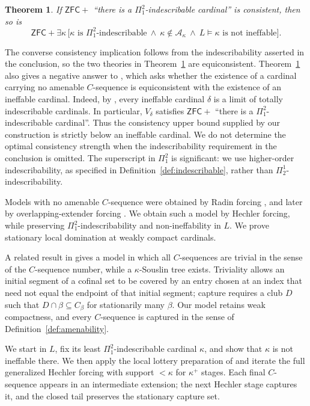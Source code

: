 \documentclass[10pt,a4paper]{amsart}
\newtheorem{theorem}{Theorem}[section]
\theoremstyle{definition}
\theoremstyle{remark}
\newcommand{\A}{\mathcal A}
\newcommand{\ZFC}{\mathsf{ZFC}}
\begin{document}
\begin{theorem}\label{thm:main}
If \(\ZFC+\) ``there is a \(\Pi^2_1\)-indescribable cardinal''
is consistent, then so is
\[
 \ZFC+\exists\kappa\,
 \bigl[\kappa\text{ is }\Pi^2_1\text{-indescribable}
       \ \land\ \kappa\notin\A_\kappa
       \ \land\ L\models\text{\(\kappa\) is not ineffable}\bigr].
\]
\end{theorem}


The converse consistency implication follows from the
indescribability asserted in the conclusion, so the two
theories in Theorem~\ref{thm:main} are equiconsistent.
Theorem~\ref{thm:main} also gives a negative answer to
\cite[Question~5.5]{BNZRad}, which asks whether the existence
of a cardinal carrying no amenable \(C\)-sequence is
equiconsistent with the existence of an ineffable cardinal.
Indeed, by \cite[Lemma~5.4]{HLN}, every ineffable cardinal
\(\delta\) is a limit of totally indescribable cardinals.
In particular, \(V_\delta\) satisfies \(\ZFC+\) ``there is
a \(\Pi^2_1\)-indescribable cardinal''. Thus the consistency
upper bound supplied by our construction is strictly below
an ineffable cardinal. We do not determine the optimal
consistency strength when the indescribability requirement
in the conclusion is omitted. The superscript in \(\Pi^2_1\)
is significant: we use higher-order indescribability,
as specified in Definition~\ref{def:indescribable},
rather than \(\Pi^1_2\)-indescribability.

Models with no amenable \(C\)-sequence were obtained by Radin
forcing \cite{BNZRad}, and later by overlapping-extender
forcing \cite{BNZApprox}. We obtain such a model by Hechler
forcing, while preserving \(\Pi^2_1\)-indescribability and
non-ineffability in \(L\). We prove stationary local
domination at weakly compact cardinals.

A related result in \cite{RYY} gives a model in which all
\(C\)-sequences are trivial in the sense of the
\(C\)-sequence number, while a \(\kappa\)-Souslin tree
exists. Triviality allows an initial segment of a cofinal
set to be covered by an entry chosen at an index that need
not equal the endpoint of that initial segment;
capture requires a club \(D\) such that
\(D\cap\beta\subseteq C_\beta\) for stationarily many
\(\beta\). Our model retains weak
compactness, and every \(C\)-sequence is captured in the
sense of Definition~\ref{def:amenability}.

We start in \(L\), fix its least
\(\Pi^2_1\)-indescribable cardinal \(\kappa\), and
show that \(\kappa\) is not ineffable there. We then
apply the local lottery preparation of \cite{Johnstone} and iterate
the full generalized Hechler forcing with support
\(<\kappa\) for \(\kappa^+\) stages. Each final
\(C\)-sequence appears in an intermediate extension;
the next Hechler stage captures it, and the closed tail
preserves the stationary capture set.
\end{document}
